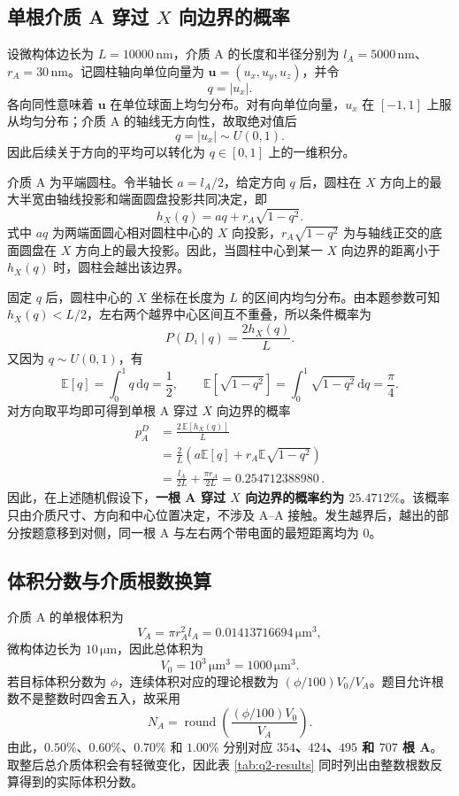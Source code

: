 \documentclass[withoutpreface,bwprint]{cumcmthesis}
\begin{document}
\subsection{单根介质 A 穿过 \texorpdfstring{$X$}{X} 向边界的概率}

设微构体边长为 $L=10000\,\mathrm{nm}$，介质 A 的长度和半径分别为 $l_A=5000\,\mathrm{nm}$、$r_A=30\,\mathrm{nm}$。记圆柱轴向单位向量为 $\boldsymbol u=(u_x,u_y,u_z)$，并令
\[
q=|u_x|.
\]
各向同性意味着 $\boldsymbol u$ 在单位球面上均匀分布。对有向单位向量，$u_x$ 在 $[-1,1]$ 上服从均匀分布；介质 A 的轴线无方向性，故取绝对值后
\[
q=|u_x|\sim U(0,1).
\]
因此后续关于方向的平均可以转化为 $q\in[0,1]$ 上的一维积分。

介质 A 为平端圆柱。令半轴长 $a=l_A/2$，给定方向 $q$ 后，圆柱在 $X$ 方向上的最大半宽由轴线投影和端面圆盘投影共同决定，即
\begin{equation}
 h_X(q)=a q+r_A\sqrt{1-q^2}.
 \label{eq:q2-hx}
\end{equation}
式中 $a q$ 为两端面圆心相对圆柱中心的 $X$ 向投影，$r_A\sqrt{1-q^2}$ 为与轴线正交的底面圆盘在 $X$ 方向上的最大投影。因此，当圆柱中心到某一 $X$ 向边界的距离小于 $h_X(q)$ 时，圆柱会越出该边界。

固定 $q$ 后，圆柱中心的 $X$ 坐标在长度为 $L$ 的区间内均匀分布。由本题参数可知 $h_X(q)<L/2$，左右两个越界中心区间互不重叠，所以条件概率为
\[
P(D_i\mid q)=\frac{2h_X(q)}{L}.
\]
又因为 $q\sim U(0,1)$，有
\[
\mathbb E[q]=\int_0^1q\,\mathrm dq=\frac12,
\qquad
\mathbb E\!\left[\sqrt{1-q^2}\right]
=\int_0^1\sqrt{1-q^2}\,\mathrm dq=\frac{\pi}{4}.
\]
对方向取平均即可得到单根 A 穿过 $X$ 向边界的概率
\begin{align}
 p_A^{D}
 &=\frac{2\,\mathbb E[h_X(q)]}{L} \\
 &=\frac{2}{L}\left(a\mathbb E[q]+r_A\mathbb E\sqrt{1-q^2}\right) \\
 &=\frac{l_A}{2L}+\frac{\pi r_A}{2L}
 =0.254712388980\, .
 \label{eq:q2-pd}
\end{align}
因此，在上述随机假设下，\textbf{一根 A 穿过 $X$ 向边界的概率约为 $25.4712\%$}。该概率只由介质尺寸、方向和中心位置决定，不涉及 A--A 接触。发生越界后，越出的部分按题意移到对侧，同一根 A 与左右两个带电面的最短距离均为 $0$。

\subsection{体积分数与介质根数换算}

介质 A 的单根体积为
\begin{equation}
 V_A=\pi r_A^2l_A
 =0.01413716694\,\mathrm{\mu m^3},
 \label{eq:q2-va}
\end{equation}
微构体边长为 $10\,\mathrm{\mu m}$，因此总体积为
\[
V_0=10^3\,\mathrm{\mu m^3}=1000\,\mathrm{\mu m^3}.
\]
若目标体积分数为 $\phi$，连续体积对应的理论根数为 $(\phi/100)V_0/V_A$。题目允许根数不是整数时四舍五入，故采用
\begin{equation}
 N_A=\operatorname{round}\!\left(\frac{(\phi/100)V_0}{V_A}\right).
 \label{eq:q2-count}
\end{equation}
由此，$0.50\%$、$0.60\%$、$0.70\%$ 和 $1.00\%$ 分别对应 \textbf{$354$、$424$、$495$ 和 $707$ 根 A}。取整后总介质体积会有轻微变化，因此表 \ref{tab:q2-results} 同时列出由整数根数反算得到的实际体积分数。
\end{document}
